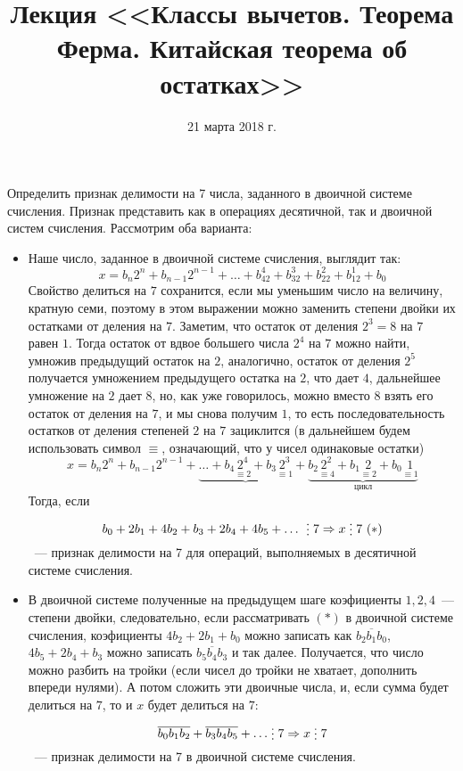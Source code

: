 \documentclass[russian]{lecture-notes}
\title{Лекция <<Классы вычетов. Теорема Ферма. Китайская теорема об остатках>>}
\date{21 марта 2018 г.}
\newcommand{\divs}{\mathrel{\raisebox{-2pt}{\vdots}}}
\newcommand{\klas}[1]{\overline{#1}}
\begin{document}
	\maketitle

\begin{problem}
	Определить признак делимости на 7 числа, заданного в двоичной системе счисления. Признак представить как в операциях десятичной, так и двоичной систем счисления. Рассмотрим оба варианта:
	\begin{itemize}
		\item Наше число, заданное в двоичной системе счисления, выглядит так: 
			\[x=b_n2^n + b_{n-1}2^{n-1} + \dots + b_42^4+ b_32^3 + b_22^2+b_12^1+b_0\]	
			Свойство делиться на $7$ сохранится, если мы уменьшим число на величину, кратную семи, поэтому в этом выражении можно заменить степени двойки их остатками от деления на $7$. Заметим, что остаток от деления $2^3 = 8$ на $7$ равен $1$. Тогда остаток от вдвое большего числа $2^4$ на $7$ можно найти, умножив предыдущий остаток на $2$, аналогично, остаток от деления $2^5$ получается умножением предыдущего остатка на $2$, что дает $4$, дальнейшее умножение на $2$ дает $8$, но, как уже говорилось, можно вместо $8$ взять его остаток от деления на $7$, и мы снова получим $1$, то есть последовательность остатков от деления степеней $2$ на $7$ зациклится (в дальнейшем будем использовать символ $\equiv$, означающий, что у чисел одинаковые остатки)
			\[x=b_n2^n + b_{n-1}2^{n-1} + \underbrace{\dots + b_4\underset{\equiv 2}{2^4}+ b_3\underset{\equiv 1}{2^3}} + \underbrace{b_2\underset{\equiv 4}{2^2}+b_1\underset{\equiv 2}{2}+b_0\underset{\equiv 1}{1}}_{\text{цикл}}\]
			Тогда, если \[ b_0 + 2b_1 + 4b_2 + b_3 + 2b_4 + 4b_5 + \ldots \ \divs 7 \Rightarrow x \divs 7 \ (\ast) \]~--- признак делимости на 7 для операций, выполняемых в десятичной системе счисления.
		\item В двоичной системе полученные на предыдущем шаге коэфициенты $1, 2, 4$~--- степени двойки, следовательно, если рассматривать $(\ast)$ в двоичной системе счисления, коэфициенты $4b_2 + 2b_1 + b_0$ можно записать как $\klas{b_2b_1b_0}$, $4b_5 + 2b_4 + b_3$ можно записать $\klas{b_5b_4b_3}$ и так далее. Получается, что число можно разбить на тройки (если чисел до тройки не хватает, дополнить впереди нулями). А потом сложить эти двоичные числа, и, если сумма будет делиться на $7$, то и $x$ будет делиться на $7$: 
		\[ 
			\klas{b_0b_1b_2} + \klas{b_3b_4b_5} + \ldots \divs 7 \Rightarrow x \divs 7 
		\]
		~--- признак делимости на 7 в двоичной системе счисления.
	\end{itemize}
	

\end{problem}
\end{document}
